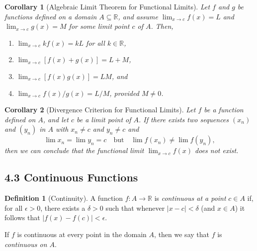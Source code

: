 \documentclass{amsart}
\newtheorem*{corollary}{Corollary}
\theoremstyle{definition}
\newtheorem*{definition}{Definition}
\newcommand{\R}{\mathbb{R}}
\newcommand{\abs}[1]{|#1|}
\begin{document}
\begin{corollary}[Algebraic Limit Theorem for Functional Limits]
  Let $f$ and $g$ be functions defined on a domain $A \subseteq \R$, and assume
  $\lim_{x \to c} f(x) = L$ and $\lim_{x \to c} g(x) = M$ for some limit point
  $c$ of $A$. Then,
  \begin{enumerate}[label={(\roman*)}]
    \item $\lim_{x \to c} k f(x) = k L$ for all $k \in \R$,
    \item $\lim_{x \to c} [f(x) + g(x)] = L + M$,
    \item $\lim_{x \to c} [f(x) g(x)] = L M$, and
    \item $\lim_{x \to c} f(x) / g(x) = L / M$, provided $M \neq 0$.
  \end{enumerate}
\end{corollary}

\begin{corollary}[Divergence Criterion for Functional Limits]
  Let $f$ be a function defined on $A$, and let $c$ be a limit point of $A$. If
  there exists two sequences $(x_n)$ and $(y_n)$ in $A$ with $x_n \neq c$ and
  $y_n \neq c$ and
  \[
    \lim x_n = \lim y_n = c \quad \text{but} \quad \lim f(x_n) \neq \lim f(y_n),
  \]
  then we can conclude that the functional limit $\lim_{x \to c} f(x)$ does not
  exist.
\end{corollary}

\subsection*{4.3 Continuous Functions}

\begin{definition}[Continuity]
  A function $f : A \to \R$ is \emph{continuous at a point} $c \in A$ if, for
  all $\epsilon > 0$, there exists a $\delta > 0$ such that whenever $\abs{x -
  c} < \delta$ (and $x \in A$) it follows that $\abs{f(x) - f(c)} < \epsilon$.

  If $f$ is continuous at every point in the domain $A$, then we say that $f$ is
  \emph{continuous on $A$}.
\end{definition}
\end{document}
